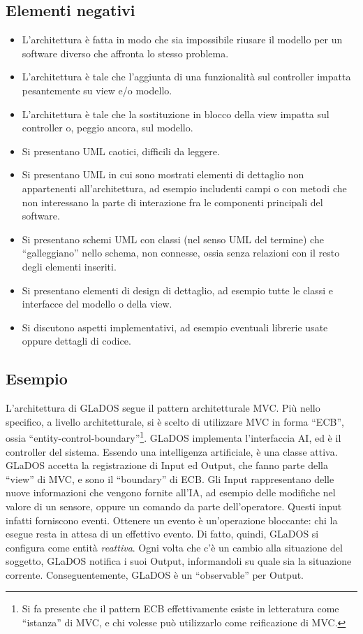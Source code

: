 \documentclass[a4paper,12pt]{report}
\begin{document}
\begin{itemize}
\subsection*{Elementi negativi}
\begin{itemize}
 \item L'architettura è fatta in modo che sia impossibile riusare il modello per un software diverso che affronta lo stesso problema.
 \item L'architettura è tale che l'aggiunta di una funzionalità sul controller impatta pesantemente su view e/o modello.
 \item L'architettura è tale che la sostituzione in blocco della view impatta sul controller o, peggio ancora, sul modello.
 \item Si presentano UML caotici, difficili da leggere.
 \item Si presentano UML in cui sono mostrati elementi di dettaglio non appartenenti all'architettura, ad esempio includenti campi o con metodi che non interessano la parte di interazione fra le componenti principali del software.
 \item Si presentano schemi UML con classi (nel senso UML del termine) che ``galleggiano'' nello schema, non connesse, ossia senza relazioni con il resto degli elementi inseriti.
 \item Si presentano elementi di design di dettaglio, ad esempio tutte le classi e interfacce del modello o della view.
 \item Si discutono aspetti implementativi, ad esempio eventuali librerie usate oppure dettagli di codice.
\end{itemize}

\subsection*{Esempio}

L'architettura di GLaDOS segue il pattern architetturale MVC.
%
Più nello specifico, a livello architetturale, si è scelto di utilizzare MVC in forma ``ECB'', ossia ``entity-control-boundary''\footnote{
Si fa presente che il pattern ECB effettivamente esiste in letteratura come ``istanza'' di MVC, e chi volesse può utilizzarlo come reificazione di MVC.
}.
%
GLaDOS implementa l'interfaccia AI, ed è il controller del sistema.
Essendo una intelligenza artificiale, è una classe attiva.
%
GLaDOS accetta la registrazione di Input ed Output, che fanno parte della ``view'' di MVC, e sono il ``boundary'' di ECB.
Gli Input rappresentano delle nuove informazioni che vengono fornite all'IA, ad esempio delle modifiche nel valore di un sensore, oppure un comando da parte dell'operatore.
Questi input infatti forniscono eventi.
Ottenere un evento è un'operazione bloccante: chi la esegue resta in attesa di un effettivo evento.
Di fatto, quindi, GLaDOS si configura come entità \textit{reattiva}.
Ogni volta che c'è un cambio alla situazione del soggetto, GLaDOS notifica i suoi Output,
informandoli su quale sia la situazione corrente.
%
Conseguentemente, GLaDOS è un ``observable'' per Output.


\end{itemize}
\end{document}
